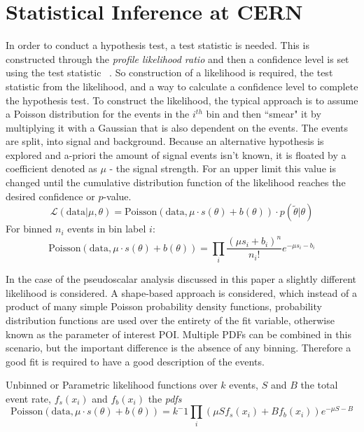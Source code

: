 \section{Statistical Inference at CERN}
In order to conduct a hypothesis test, a test statistic is needed. This is constructed through the \textit{profile likelihood ratio} and then a confidence level is set using the test statistic ~\cite{Cowan_2011}.
So construction of a likelihood is required, the test statistic from the likelihood, and a way to calculate a confidence level to complete the hypothesis test.
To construct the likelihood, the typical approach is to assume a Poisson distribution for the events in the $i^{th}$ bin and then ``smear" it by multiplying it with a Gaussian that is also dependent on the events. The events are split, into signal and background. Because an alternative hypothesis is explored and a-priori the amount of signal events isn't known, it is floated by a coefficient denoted as $\mu$ - the signal strength. For an upper limit this value is changed until the cumulative distribution function of the likelihood reaches the desired confidence or $p$-value.  
\begin{equation}\mathcal{L}(\text{data}|\mu,\theta) = \text{Poisson}(\text{data},\mu\cdot s(\theta)+b(\theta)) \cdot p(\tilde{\theta}|\theta) \end{equation}
For binned $n_i$ events in bin label $i$:
\begin{equation}
\text{Poisson}(\text{data},\mu\cdot s(\theta)+b(\theta)) = \prod_i \frac{(\mu s_i+b_i)^n}{n_i !}e^{-\mu s_i -b_i}
\end{equation}

In the case of the pseudoscalar analysis discussed in this paper a slightly different likelihood is considered. A shape-based approach is considered, which instead of a product of many simple Poisson probability density functions, probability distribution functions are used over the entirety of the fit variable, otherwise known as the parameter of interest POI. Multiple PDFs can be combined in this scenario, but the important difference is the absence of any binning. Therefore a good fit is required to have a good description of the events.  

Unbinned or Parametric likelihood functions over $k$ events, $S$ and $B$ the total event rate, $f_s(x_i)$ and $f_b(x_i)$ the \textit{pdfs}
 \begin{equation}\text{Poisson}(\text{data},\mu\cdot s(\theta)+b(\theta)) = k^-1 \prod_i(\mu S f_s(x_i) + B f_b(x_i))e^{-\mu S - B}\end{equation}

